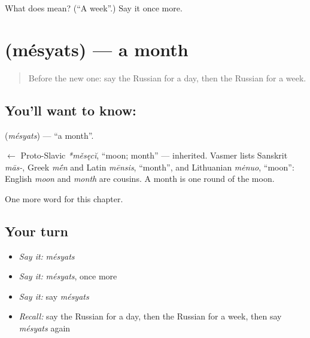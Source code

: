 \begin{tcolorbox}[breakable,colback=teal!4,colframe=teal!35!black,title={Before you move on}]
What does  mean? (\textquotedblleft{}A week\textquotedblright{}.) Say it once more.
\end{tcolorbox}
\section[\texorpdfstring{\ru{месяц} (mésyats)}{месяц (mésyats)}]{ (mésyats) — a month}

\label{lesson:RU-C68-month}



\begin{quote}
Before the new one: say the Russian for a day, then the Russian for a week.
\end{quote}

\subsection*{You'll want to know: }
\textbf{} (\emph{mésyats}) — \textquotedblleft{}a month\textquotedblright{}.

\begin{cousinweb}
\textbf{} $\leftarrow$ Proto-Slavic \emph{*měsęcĭ}, \textquotedblleft{}moon; month\textquotedblright{} — inherited. Vasmer lists Sanskrit \emph{mās-}, Greek \emph{m\'{\={e}}n} and Latin \emph{mēnsis}, \textquotedblleft{}month\textquotedblright{}, and Lithuanian \emph{mėnuo}, \textquotedblleft{}moon\textquotedblright{}: English \emph{moon} and \emph{month} are cousins. A month is one round of the moon.
\end{cousinweb}

\begin{grammarlens}[title={What you've built}]
One more word for this chapter.
\end{grammarlens}

\subsection*{Your turn}
\begin{itemize}
\raggedright
  \item \emph{Say it:} \emph{mésyats}
  \item \emph{Say it:} \emph{mésyats}, once more
  \item \emph{Say it:} say \emph{mésyats}
  \item \emph{Recall:} say the Russian for a day, then the Russian for a week, then say \emph{mésyats} again
\end{itemize}

